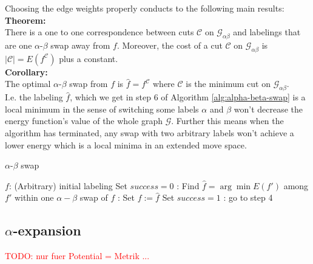 \documentclass{scrartcl}[12pt, halfparskip]
\newcommand{\todo}[1]{\textcolor{red}{TODO: #1}}
\begin{document}
Choosing the edge weights properly conducts to the following main results: \\

\textbf{Theorem:}\\
There is a one to one correspondence between cuts $\mathcal{C}$ on $\mathcal{G}_{\alpha \beta}$ and labelings that are one $\alpha$-$\beta$ swap away from $f$. Moreover, the cost of a cut $\mathcal{C}$ on $\mathcal{G}_{\alpha \beta}$ is $|\mathcal{C}| = E(f^\mathcal{C})$ plus a constant. \\

\textbf{Corollary:}\\
The optimal $\alpha$-$\beta$ swap from $f$ is $\hat{f} = f^\mathcal{C}$ where $\mathcal{C}$ is the minimum cut on $\mathcal{G}_{\alpha \beta}$. \\


I.e. the labeling $\hat{f}$, which we get in step 6 of Algorithm \ref{alg:alpha-beta-swap} is a local minimum in the sense of switching some labels $\alpha$ and $\beta$ won't decrease the energy function's value of the whole graph $\mathcal{G}$. Further this means when the algorithm has terminated, any swap with two arbitrary labels won't achieve a lower energy which is a local minima in an extended move space.



\begin{algorithm}[H]
\caption{$\alpha$-$\beta$ swap}\label{alg:alpha-beta-swap}
\begin{algorithmic}[1]
	\State $f$: (Arbitrary) initial labeling 
	\State
	\State Set $success = 0$
	:
		\State Find $\hat{f} = \arg \min E(f')$ among $f'$ within one $\alpha-\beta$ swap of $f$
		:
			\State Set $f := \hat{f}$
			\State Set $success = 1$
		\EndIf
	\EndFor
	:
		\State go to step 4
	\EndIf
	\State
	\State {}
\EndProcedure
\end{algorithmic}
\end{algorithm}








\subsection{$\alpha$-expansion}

\todo{nur fuer Potential = Metrik ...}
\end{document}
